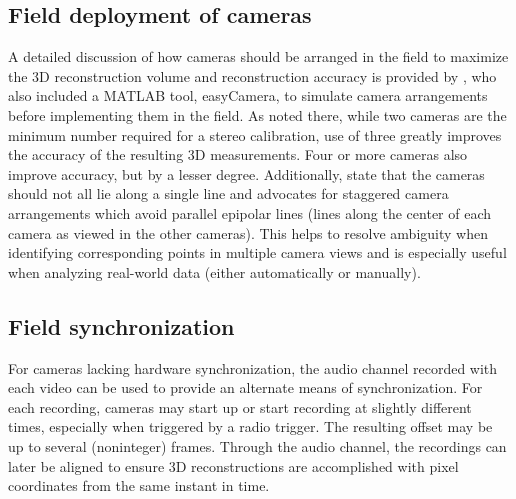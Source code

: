 \documentclass[fleqn,10pt]{wlpeerj}
\begin{document}
\subsection*{Field deployment of cameras}
A detailed discussion of how cameras should be arranged in the field to maximize the 3D reconstruction volume and reconstruction accuracy is provided by \citet{Theriault:2014}, who also included a MATLAB tool, easyCamera, to simulate camera arrangements before implementing them in the field. As noted there, while two cameras are the minimum number required for a stereo calibration, use of three greatly improves the accuracy of the resulting 3D measurements.  Four or more cameras also improve accuracy, but by a lesser degree.  Additionally, \citet{Theriault:2014} state that the cameras should not all lie along a single line and advocates for staggered camera arrangements which avoid parallel epipolar lines (lines along the center of each camera as viewed in the other cameras).  This helps to resolve ambiguity when identifying corresponding points in multiple camera views and is especially useful when analyzing real-world data (either automatically or manually). 

\subsection*{Field synchronization}
For cameras lacking hardware synchronization, the audio channel recorded with each video can be used to provide an alternate means of synchronization. For each recording, cameras may start up or start recording at slightly different times, especially when triggered by a radio trigger.  The resulting offset may be up to several (noninteger) frames.  Through the audio channel, the recordings can later be aligned to ensure 3D reconstructions are accomplished with pixel coordinates from the same instant in time. 
\end{document}
